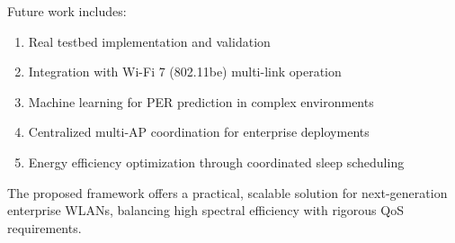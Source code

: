 \documentclass[conference]{IEEEtran}
\begin{document}
Future work includes:
\begin{enumerate}
    \item Real testbed implementation and validation
    \item Integration with Wi-Fi 7 (802.11be) multi-link operation \cite{5}
    \item Machine learning for PER prediction in complex environments
    \item Centralized multi-AP coordination for enterprise deployments
    \item Energy efficiency optimization through coordinated sleep scheduling
\end{enumerate}

The proposed framework offers a practical, scalable solution for next-generation enterprise WLANs, balancing high spectral efficiency with rigorous QoS requirements.
\end{document}
